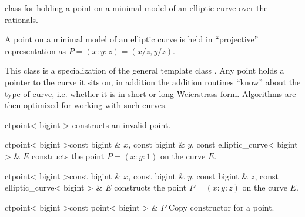 

\NAME

 \dotfill class for holding a point on a minimal model of an elliptic
curve over the rationals.



\ABSTRACT

A point on a minimal model of an elliptic curve is held in ``projective'' representation as $P =
(x:y:z) = (x/z, y/z)$.



\DESCRIPTION

This class is a specialization of the general template class .  Any point holds
a pointer to the curve it sits on, in addition the addition routines ``know'' about the type of
curve, i.e. whether it is in short or long Weierstrass form.  Algorithms are then optimized for
working with such curves.



\CONS

\begin{fcode}{ct}{point< bigint >}{}
  constructs an invalid point.
\end{fcode}

\begin{fcode}{ct}{point< bigint >}{const bigint & $x$, const bigint & $y$,
    const elliptic_curve< bigint > & $E$}%
  constructs the point $P = (x:y:1)$ on the curve $E$.
\end{fcode}

\begin{fcode}{ct}{point< bigint >}{const bigint & $x$, const bigint & $y$,
    const bigint & $z$, const elliptic_curve< bigint > & $E$}%
  constructs the point $P = (x:y:z)$ on the curve $E$.
\end{fcode}

\begin{fcode}{ct}{point< bigint >}{const point< bigint > & $P$}
  Copy constructor for a point.
\end{fcode}

